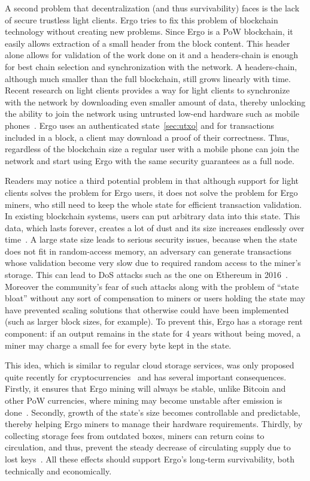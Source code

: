 A second problem that decentralization (and thus survivability) faces is the lack of secure trustless light clients. Ergo tries to fix this problem of blockchain technology without creating new problems. Since Ergo is a PoW blockchain, it easily allows extraction of a small header from the block content.
This header alone allows for validation of the work done on it and a headers-chain is enough for best chain selection and synchronization with the network.
A headers-chain, although much smaller than the full blockchain, still grows linearly with time.
Recent research on light clients provides a way for light clients to synchronize with the network by downloading even smaller amount of data, thereby unlocking the ability to join the network using untrusted low-end hardware such as mobile phones~\cite{kiayias2017non,luuflyclient}.
Ergo uses an authenticated state~\ref{sec:utxo} and for transactions included in a block, a client may download a proof of their correctness.
Thus, regardless of the blockchain size a regular user with
a mobile phone can join the network and start using Ergo with the same security
guarantees as a full node.

Readers may notice a third potential problem in that although support for light clients solves the problem for Ergo users, it does not solve the problem for Ergo miners, who still need to keep the whole state for efficient transaction validation.
In existing blockchain systems, users can put arbitrary data into this state. This data, which lasts forever, creates a lot of dust and its size increases endlessly over time~\cite{perez2019another}.
A large state size leads to serious security issues, because when the state does not fit in random-access memory, an adversary can generate transactions whose validation become very slow due to required random access to the miner's storage. This can lead to DoS attacks such as the one on Ethereum in 2016~\cite{ethDos2016}.
Moreover the community's fear of such attacks along with the problem of ``state bloat'' without any sort of compensation to miners or users holding the state may have prevented scaling solutions that otherwise
could have been implemented (such as larger block sizes, for example).
To prevent this, Ergo has a storage rent component: if an
output remains in the state for 4 years without being moved, a miner may charge a small fee for every
byte kept in the state.

This idea, which is similar to regular cloud storage services, was only proposed quite recently for cryptocurrencies~\cite{chepurnoy2017space} and has several important consequences.
Firstly, it ensures that Ergo mining will always be stable, unlike Bitcoin and other PoW currencies, where mining may become unstable after emission is done~\cite{carlsten2016instability}.
Secondly, growth of the state's size becomes controllable and predictable, thereby helping Ergo miners to manage their hardware requirements.
Thirdly, by collecting storage fees from outdated boxes, miners can return coins to circulation, and thus, prevent the steady decrease of circulating supply due to lost keys~\cite{wsj2018}.
All these effects should support Ergo's long-term survivability, both technically and economically.

